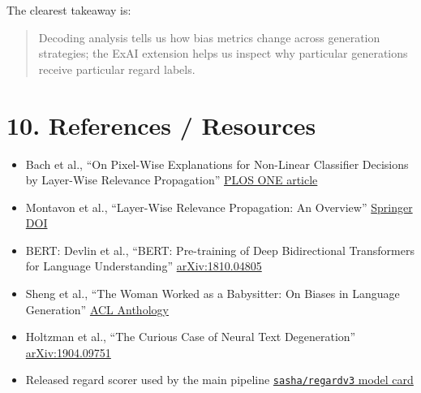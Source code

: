 \documentclass[11pt]{article}
\begin{document}
The clearest takeaway is:

\begin{quote}
Decoding analysis tells us how bias metrics change across generation strategies; the ExAI extension helps us inspect why particular generations receive particular regard labels.\\
\end{quote}

\section*{10. References / Resources}

\begin{itemize}
\item Bach et al., “On Pixel-Wise Explanations for Non-Linear Classifier Decisions by Layer-Wise Relevance Propagation”   \href{https://doi.org/10.1371/journal.pone.0130140}{PLOS ONE article}
\end{itemize}

\begin{itemize}
\item Montavon et al., “Layer-Wise Relevance Propagation: An Overview”   \href{https://doi.org/10.1007/978-3-030-28954-6_10}{Springer DOI}
\end{itemize}

\begin{itemize}
\item BERT: Devlin et al., “BERT: Pre-training of Deep Bidirectional Transformers for Language Understanding”   \href{https://arxiv.org/abs/1810.04805}{arXiv:1810.04805}
\end{itemize}

\begin{itemize}
\item Sheng et al., “The Woman Worked as a Babysitter: On Biases in Language Generation”   \href{https://aclanthology.org/D19-1339/}{ACL Anthology}
\end{itemize}

\begin{itemize}
\item Holtzman et al., “The Curious Case of Neural Text Degeneration”   \href{https://arxiv.org/abs/1904.09751}{arXiv:1904.09751}
\end{itemize}

\begin{itemize}
\item Released regard scorer used by the main pipeline   \href{https://huggingface.co/sasha/regardv3}{\texttt{sasha/regardv3} model card}
\end{itemize}
\end{document}
